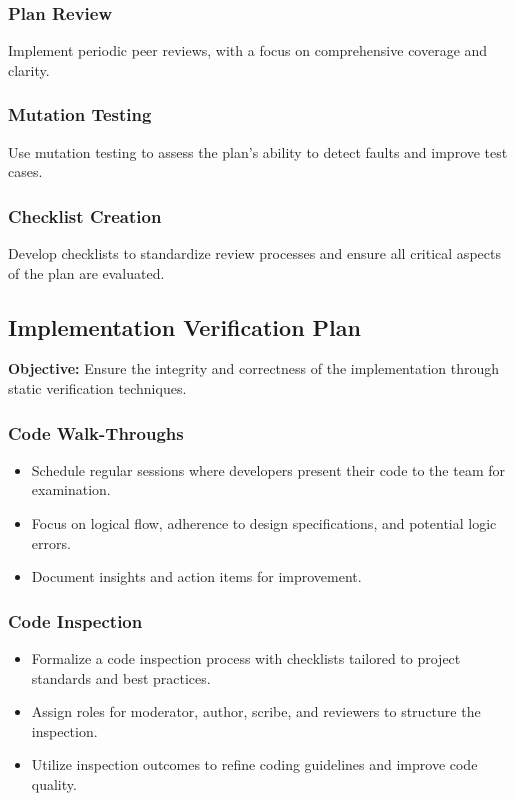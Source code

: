 \documentclass[12pt, titlepage]{article}
\begin{document}
    \subsubsection{Plan Review}
    Implement periodic peer reviews, with a focus on comprehensive coverage and clarity.

    \subsubsection{Mutation Testing}
    Use mutation testing to assess the plan's ability to detect faults and improve test cases.

    \subsubsection{Checklist Creation}
    Develop checklists to standardize review processes and ensure all critical aspects of the plan are evaluated.

    \subsection{Implementation Verification Plan}

    \noindent \textbf{Objective:} Ensure the integrity and correctness of the implementation through static verification techniques.

    \subsubsection{Code Walk-Throughs}
    \begin{itemize}
        \item Schedule regular sessions where developers present their code to the team for examination.
        \item Focus on logical flow, adherence to design specifications, and potential logic errors.
        \item Document insights and action items for improvement.
    \end{itemize}

    \subsubsection{Code Inspection}
    \begin{itemize}
        \item Formalize a code inspection process with checklists tailored to project standards and best practices.
        \item Assign roles for moderator, author, scribe, and reviewers to structure the inspection.
        \item Utilize inspection outcomes to refine coding guidelines and improve code quality.
    \end{itemize}
\end{document}
